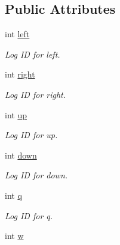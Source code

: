 \subsection*{Public Attributes}
\begin{DoxyCompactItemize}
\item 
\mbox{\label{classInput_aa5becba821fbe9c146c332091ebcc6f2}} 
int \hyperlink{classInput_aa5becba821fbe9c146c332091ebcc6f2}{left}
\begin{DoxyCompactList}\small\item\em Log ID for left. \end{DoxyCompactList}\item 
\mbox{\label{classInput_a481ae9265fafe80dad6850a24980bfb5}} 
int \hyperlink{classInput_a481ae9265fafe80dad6850a24980bfb5}{right}
\begin{DoxyCompactList}\small\item\em Log ID for right. \end{DoxyCompactList}\item 
\mbox{\label{classInput_ad83fb715e39bdc509caf1c2bb7bf692d}} 
int \hyperlink{classInput_ad83fb715e39bdc509caf1c2bb7bf692d}{up}
\begin{DoxyCompactList}\small\item\em Log ID for up. \end{DoxyCompactList}\item 
\mbox{\label{classInput_a24c4a5d08fb4de9300931efb8e7787fb}} 
int \hyperlink{classInput_a24c4a5d08fb4de9300931efb8e7787fb}{down}
\begin{DoxyCompactList}\small\item\em Log ID for down. \end{DoxyCompactList}\item 
\mbox{\label{classInput_ad1b648983bba177348f968e05dccfb4a}} 
int \hyperlink{classInput_ad1b648983bba177348f968e05dccfb4a}{q}
\begin{DoxyCompactList}\small\item\em Log ID for q. \end{DoxyCompactList}\item 
\mbox{\label{classInput_a50cd82a148ff2ee1bd6f1692277ae5d2}} 
int \hyperlink{classInput_a50cd82a148ff2ee1bd6f1692277ae5d2}{w}

\end{DoxyCompactItemize}
